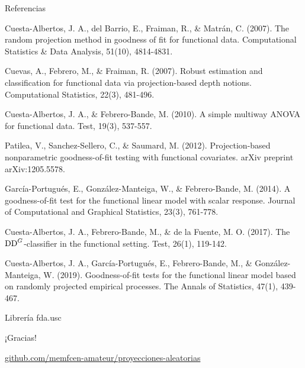 \documentclass[10pt,spanish]{beamer}\usepackage[]{graphicx}\usepackage[]{color}
\begin{document}
\begin{frame}[shrink=30]{Referencias}

\appendix
\begin{thebibliography}{References}
Cuesta-Albertos, J. A., del Barrio,
E., Fraiman, R., \& Matrán, C. (2007). The random projection method
in goodness of fit for functional data. Computational Statistics \&
Data Analysis, 51(10), 4814-4831.

Cuevas, A., Febrero, M., \& Fraiman,
R. (2007). Robust estimation and classification for functional data
via projection-based depth notions. Computational Statistics, 22(3),
481-496.

Cuesta-Albertos, J. A., \& Febrero-Bande,
M. (2010). A simple multiway ANOVA for functional data. Test, 19(3),
537-557.

Patilea, V., Sanchez-Sellero,
C., \& Saumard, M. (2012). Projection-based nonparametric goodness-of-fit
testing with functional covariates. arXiv preprint arXiv:1205.5578.

García-Portugués, E., González-Manteiga,
W., \& Febrero-Bande, M. (2014). A goodness-of-fit test for the functional
linear model with scalar response. Journal of Computational and Graphical
Statistics, 23(3), 761-778. 

Cuesta-Albertos, J. A., Febrero-Bande,
M., \& de la Fuente, M. O. (2017). The $\hbox{DD}^{G}$-classifier
in the functional setting. Test, 26(1), 119-142.

Cuesta-Albertos, J. A., García-Portugués,
E., Febrero-Bande, M., \& González-Manteiga, W. (2019). Goodness-of-fit
tests for the functional linear model based on randomly projected
empirical processes. The Annals of Statistics, 47(1), 439-467.

 Librería fda.usc
\end{thebibliography}
\end{frame}
%
\begin{frame}[standout]

{\huge{}¡Gracias!}{\huge\par}

\pause{}

{\scriptsize{}\alert{{\scriptsize{}\href{https://github.com/memfcen-amateur/proyecciones-aleatorias/tree/master}{github.com/memfcen-amateur/proyecciones-aleatorias}}}}{\scriptsize\par}

\end{frame}
\end{document}
